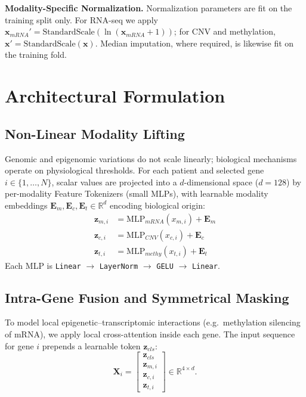 \documentclass[10pt, twocolumn]{article}
\begin{document}
\vspace{0.2cm}\noindent\textbf{Modality-Specific Normalization.}
Normalization parameters are fit on the training split only. For RNA-seq we apply
$\mathbf{x}_{mRNA}' = \text{StandardScale}(\ln(\mathbf{x}_{mRNA} + 1))$; for CNV
and methylation, $\mathbf{x}' = \text{StandardScale}(\mathbf{x})$. Median
imputation, where required, is likewise fit on the training fold.

\section{Architectural Formulation}

\subsection{Non-Linear Modality Lifting}
Genomic and epigenomic variations do not scale linearly; biological mechanisms
operate on physiological thresholds. For each patient and selected gene
$i \in \{1,\dots,N\}$, scalar values are projected into a $d$-dimensional space
($d=128$) by per-modality Feature Tokenizers (small MLPs), with learnable modality
embeddings $\mathbf{E}_m, \mathbf{E}_c, \mathbf{E}_t \in \mathbb{R}^d$ encoding
biological origin:
\begin{align}
    \mathbf{z}_{m,i} &= \text{MLP}_{mRNA}(x_{m,i}) + \mathbf{E}_{m} \\
    \mathbf{z}_{c,i} &= \text{MLP}_{CNV}(x_{c,i}) + \mathbf{E}_{c} \\
    \mathbf{z}_{t,i} &= \text{MLP}_{methy}(x_{t,i}) + \mathbf{E}_{t}
\end{align}
Each MLP is \texttt{Linear} $\to$ \texttt{LayerNorm} $\to$ \texttt{GELU} $\to$
\texttt{Linear}.

\subsection{Intra-Gene Fusion and Symmetrical Masking}
To model local epigenetic--transcriptomic interactions (e.g.\ methylation
silencing of mRNA), we apply local cross-attention inside each gene. The input
sequence for gene $i$ prepends a learnable token $\mathbf{z}_{cls}$:
\begin{equation}
    \mathbf{X}_i = \begin{bmatrix} \mathbf{z}_{cls} \\ \mathbf{z}_{m,i} \\
    \mathbf{z}_{c,i} \\ \mathbf{z}_{t,i} \end{bmatrix} \in \mathbb{R}^{4 \times d}.
\end{equation}
\end{document}
